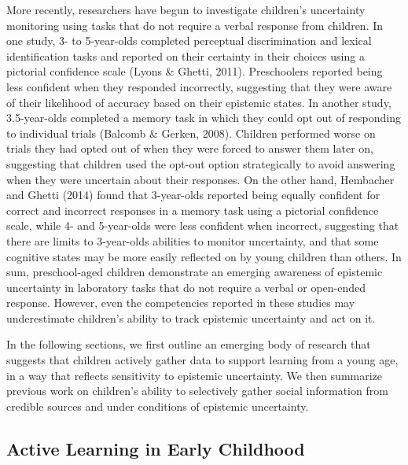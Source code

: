 \documentclass[a4paper,man,apacite,floatsintext]{apa6}
\begin{document}
More recently, researchers have begun to investigate children's
uncertainty monitoring using tasks that do not require a verbal response
from children. In one study, 3- to 5-year-olds completed perceptual
discrimination and lexical identification tasks and reported on their
certainty in their choices using a pictorial confidence scale (Lyons \&
Ghetti, 2011). Preschoolers reported being less confident when they
responded incorrectly, suggesting that they were aware of their
likelihood of accuracy based on their epistemic states. In another
study, 3.5-year-olds completed a memory task in which they could opt out
of responding to individual trials (Balcomb \& Gerken, 2008). Children
performed worse on trials they had opted out of when they were forced to
answer them later on, suggesting that children used the opt-out option
strategically to avoid answering when they were uncertain about their
responses. On the other hand, Hembacher and Ghetti (2014) found that
3-year-olds reported being equally confident for correct and incorrect
responses in a memory task using a pictorial confidence scale, while 4-
and 5-year-olds were less confident when incorrect, suggesting that
there are limits to 3-year-olds abilities to monitor uncertainty, and
that some cognitive states may be more easily reflected on by young
children than others. In sum, preschool-aged children demonstrate an
emerging awareness of epistemic uncertainty in laboratory tasks that do
not require a verbal or open-ended response. However, even the
competencies reported in these studies may underestimate children's
ability to track epistemic uncertainty and act on it.

In the following sections, we first outline an emerging body of research
that suggests that children actively gather data to support learning
from a young age, in a way that reflects sensitivity to epistemic
uncertainty. We then summarize previous work on children's ability to
selectively gather social information from credible sources and under
conditions of epistemic uncertainty.

\subsection{Active Learning in Early
Childhood}\label{active-learning-in-early-childhood}
\end{document}
